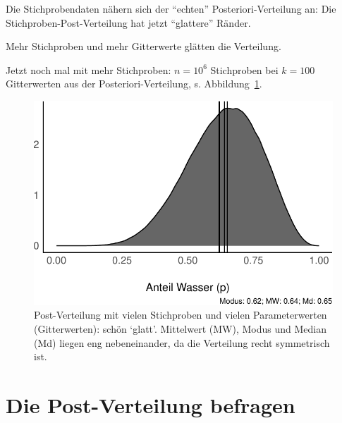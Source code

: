 \documentclass[
  a4paper,
  DIV=11]{scrreprt}
\theoremstyle{definition}
\theoremstyle{remark}
\begin{document}
Die Stichprobendaten nähern sich der ``echten'' Posteriori-Verteilung
an: Die Stichproben-Post-Verteilung hat jetzt ``glattere'' Ränder.

\begin{tcolorbox}[enhanced jigsaw, leftrule=.75mm, toptitle=1mm, bottomtitle=1mm, titlerule=0mm, breakable, colframe=quarto-callout-note-color-frame, title=\textcolor{quarto-callout-note-color}{\faInfo}\hspace{0.5em}{Hinweis}, rightrule=.15mm, colback=white, arc=.35mm, left=2mm, bottomrule=.15mm, coltitle=black, opacitybacktitle=0.6, toprule=.15mm, colbacktitle=quarto-callout-note-color!10!white, opacityback=0]
Mehr Stichproben und mehr Gitterwerte glätten die Verteilung.
\end{tcolorbox}

Jetzt noch mal mit mehr Stichproben: \(n=10^6\) Stichproben bei
\(k=100\) Gitterwerten aus der Posteriori-Verteilung, s.
Abbildung~\ref{fig-post-dk100}.

\begin{figure}

{\centering \includegraphics{./Post_files/figure-pdf/fig-post-dk100-1.pdf}

}

\caption{\label{fig-post-dk100}Post-Verteilung mit vielen Stichproben
und vielen Parameterwerten (Gitterwerten): schön `glatt'. Mittelwert
(MW), Modus und Median (Md) liegen eng nebeneinander, da die Verteilung
recht symmetrisch ist.}

\end{figure}

\hypertarget{die-post-verteilung-befragen}{%
\section{Die Post-Verteilung
befragen}\label{die-post-verteilung-befragen}}
\end{document}
